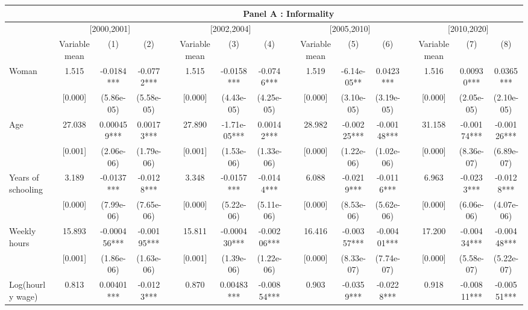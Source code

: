 \begin{tabular}{lccccccccccccccc}
\toprule
      & \multicolumn{15}{c}{Panel A : Informality } \\
\midrule
      & \multicolumn{3}{c}{[2000,2001]} &       & \multicolumn{3}{c}{[2002,2004]} &       & \multicolumn{3}{c}{[2005,2010]} &       & \multicolumn{3}{c}{[2010,2020]} \\
\cmidrule{2-4}\cmidrule{6-8}\cmidrule{10-12}\cmidrule{14-16}      & Variable mean & (1)   & (2)   &       & Variable mean & (3)   & (4)   &       & Variable mean & (5)   & (6)   &       & Variable mean & (7)   & (8) \\
\midrule
\midrule
Woman & 1.515 & -0.0184*** & -0.0772*** &       & 1.515 & -0.0158*** & -0.0746*** &       & 1.519 & -6.14e-05** & 0.0423*** &       & 1.516 & 0.00930*** & 0.0365*** \\
      & [0.000] & (5.86e-05) & (5.58e-05) &       & [0.000] & (4.43e-05) & (4.25e-05) &       & [0.000] & (3.10e-05) & (3.19e-05) &       & [0.000] & (2.05e-05) & (2.10e-05) \\
Age   & 27.038 & 0.000459*** & 0.00173*** &       & 27.890 & -1.71e-05*** & 0.00142*** &       & 28.982 & -0.00225*** & -0.00148*** &       & 31.158 & -0.00174*** & -0.00126*** \\
      & [0.001] & (2.06e-06) & (1.79e-06) &       & [0.001] & (1.53e-06) & (1.33e-06) &       & [0.000] & (1.22e-06) & (1.02e-06) &       & [0.000] & (8.36e-07) & (6.89e-07) \\
Years of schooling & 3.189 & -0.0137*** & -0.0128*** &       & 3.348 & -0.0157*** & -0.0144*** &       & 6.088 & -0.0219*** & -0.0116*** &       & 6.963 & -0.0233*** & -0.0128*** \\
      & [0.000] & (7.99e-06) & (7.65e-06) &       & [0.000] & (5.22e-06) & (5.11e-06) &       & [0.000] & (8.53e-06) & (5.62e-06) &       & [0.000] & (6.06e-06) & (4.07e-06) \\
Weekly hours & 15.893 & -0.000456*** & -0.00195*** &       & 15.811 & -0.000430*** & -0.00206*** &       & 16.416 & -0.00357*** & -0.00401*** &       & 17.200 & -0.00434*** & -0.00448*** \\
      & [0.001] & (1.86e-06) & (1.63e-06) &       & [0.001] & (1.39e-06) & (1.22e-06) &       & [0.000] & (8.33e-07) & (7.74e-07) &       & [0.000] & (5.58e-07) & (5.22e-07) \\
Log(hourly wage) & 0.813 & 0.00401*** & -0.0123*** &       & 0.870 & 0.00483*** & -0.00854*** &       & 0.903 & -0.0359*** & -0.0228*** &       & 0.918 & -0.00811*** & -0.00551*** \\

\end{tabular}
